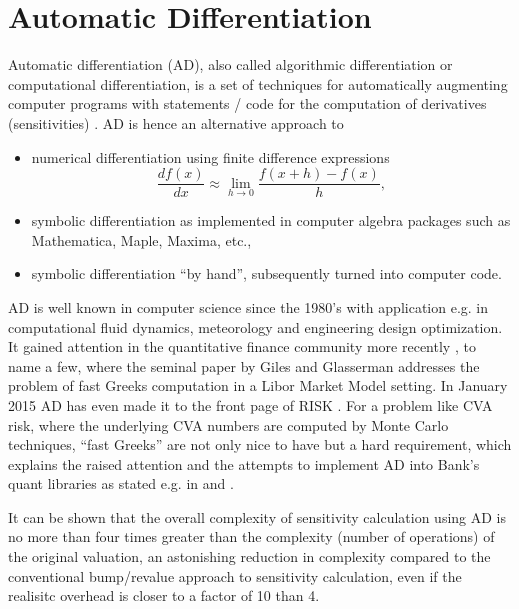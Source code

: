 \section{Automatic Differentiation}
\label{sec:computationgraph}

Automatic differentiation (AD), also called algorithmic differentiation or computational
differentiation, is a set of techniques for automatically augmenting computer programs with
statements / code for the computation of derivatives (sensitivities) \cite{autodiff}.
AD is hence an alternative approach to
\begin{itemize}
\item numerical differentiation using
finite difference expressions
$$
\frac{df(x)}{dx} \approx \lim_{h\rightarrow 0} \frac{f(x+h)-f(x)}{h},
$$
\item symbolic differentiation as implemented in computer algebra packages
such as Mathematica, Maple, Maxima, etc.,
\item symbolic differentiation ``by
hand'', subsequently turned into computer code.
\end{itemize}

AD is well known in computer science since the 1980's with application e.g. in
computational fluid dynamics, meteorology and engineering design
optimization. It gained attention in the quantitative finance community more recently
\cite{giles_2006, leclerc_2009, joshi_2010, capriotti_2010,
  capriotti_2011, capriotti_2011b, capriotti_2011c}, to name a few, where the seminal paper by
Giles and Glasserman \cite{giles_2006} addresses the problem of fast Greeks computation
in a Libor Market Model setting. In January 2015 AD has even made it to the front
page of RISK \cite{sherif_2015}. For a problem like CVA risk, where the underlying
CVA numbers are computed by Monte Carlo techniques, ``fast Greeks''
are not only nice to have but a hard requirement, which explains the
raised attention and the attempts to implement AD into Bank's quant libraries as stated e.g. in
\cite{capriotti_2011b} and \cite{sherif_2015}.

It can be shown \cite{griewank_2000} that the overall
complexity of sensitivity calculation using AD is no more than
four times greater than the complexity (number of operations) of the original valuation,
an astonishing reduction in complexity compared to the conventional
bump/revalue approach to sensitivity calculation, even if the realisitc overhead is closer to a
factor of 10 than 4.

